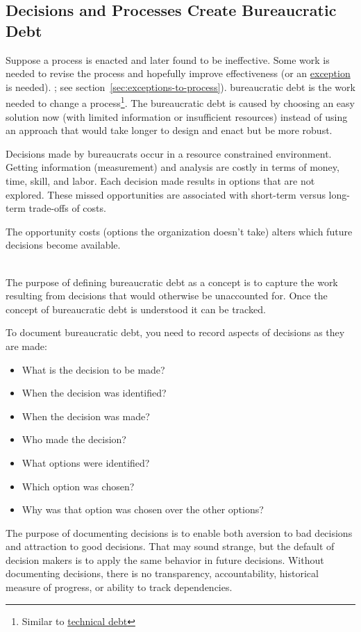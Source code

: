 \subsection*{Decisions and Processes Create Bureaucratic Debt\label{sec:bureaucratic-debt}}


Suppose a \gls{process} is enacted and later found to be ineffective. Some work is needed to revise the process and hopefully improve effectiveness (or an \hyperref[sec:exceptions-to-process]{exception} is needed).
\ifsectionref
; see section~\ref{sec:exceptions-to-process}).
\fi
\gls{bureaucratic debt} is 
 the work needed to change a process\footnote{Similar to \href{https://en.wikipedia.org/wiki/Technical_debt}{technical debt}}. The bureaucratic debt is caused by choosing an easy solution now (with limited information or insufficient resources) instead of using an approach that would take longer to design and enact but be more robust.


Decisions made by \glspl{bureaucrat} occur in a resource constrained environment.
Getting information (measurement) and analysis are costly in terms of money, time, skill, and labor.
Each decision made results in options that are not explored. These missed opportunities are associated with short-term versus long-term trade-offs of costs.

The opportunity costs (options the organization doesn't take) alters which future decisions become available.

\ \\

The purpose of defining bureaucratic debt as a concept is to capture the work resulting from decisions that would otherwise be unaccounted for.
Once the concept of bureaucratic debt is understood it can be tracked.

To document bureaucratic debt, you need to record aspects of decisions as they are made:
\begin{itemize}
    \item What is the decision to be made?
    \item When the decision was identified?
    \item When the decision was made?
    \item Who made the decision?
    \item What options were identified?
    \item Which option was chosen?
    \item Why was that option was chosen over the other options?
\end{itemize}
The purpose of documenting decisions is to enable both aversion to bad decisions and attraction to good decisions. That may sound strange, but the default of decision makers is to apply the same behavior in future decisions. 
Without documenting decisions, there is no transparency, accountability, historical measure of progress, or ability to track dependencies. 

